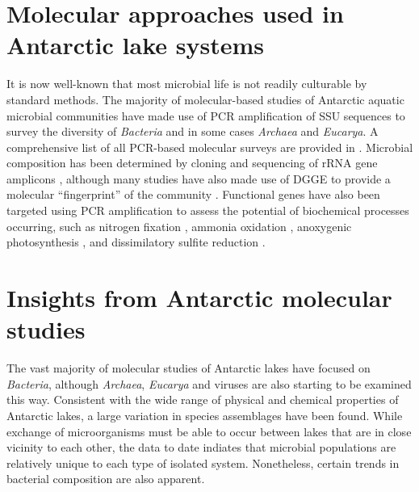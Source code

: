 \section{Molecular approaches used in Antarctic lake systems}
\label{in:mol}
It is now well-known that most microbial life is not readily culturable by standard methods.
The majority of molecular-based studies of Antarctic aquatic microbial communities have made use of \ac{PCR} amplification of \ac{SSU} sequences to survey the diversity of \emph{Bacteria}
 and in some cases \emph{Archaea} and \emph{Eucarya}.
A comprehensive list of all PCR-based molecular surveys are provided in .
Microbial composition has been determined by cloning and sequencing of \ac{rRNA} gene amplicons 
\cite{Bowman2000a, Bowman2000b, Gordon2000, Christner2001, Purdy2003, Karr2006, Matsuzaki2006, Kurosawa2010, Bielewicz2011}, 
although many studies have also made use of \ac{DGGE} to provide a molecular ``fingerprint'' of the community 
\cite{Pearce2003a, Pearce2003b, Karr2005, Pearce2005a, Pearce2005b, Unrein2005, Glatz2006, Mikucki2007, Mosier2007, Schiaffino2009, Villaescusa2010}.
Functional genes have also been targeted using \ac{PCR} amplification to assess the potential of biochemical processes occurring, such as nitrogen fixation \cite{Olson1998}, 
ammonia oxidation \cite{Voytek1999}, anoxygenic photosynthesis \cite{Karr2003}, and dissimilatory sulfite reduction \cite{Karr2005, Mikucki2009}. %
%


\section{Insights from Antarctic molecular studies}
\label{in:insights}
The vast majority of molecular studies of Antarctic lakes have focused on \emph{Bacteria}, although \emph{Archaea}, \emph{Eucarya} and viruses are also starting to be examined this way.
Consistent with the wide range of physical and chemical properties of Antarctic lakes, a large variation in species assemblages have been found.
While exchange of microorganisms must be able to occur between lakes that are in close vicinity to each other, 
 the data to date indiates that microbial populations are relatively unique to each type of isolated system. 
Nonetheless, certain trends in bacterial composition are also apparent.


